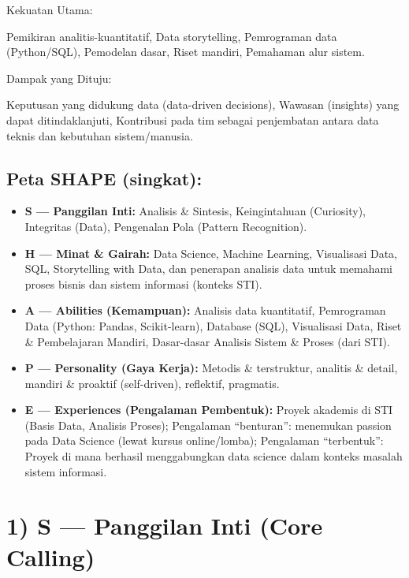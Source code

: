 \documentclass[
  letterpaper,
  DIV=11,
  numbers=noendperiod]{scrreprt}
\providecommand{\tightlist}{%
  \setlength{\itemsep}{0pt}\setlength{\parskip}{0pt}}
\begin{document}
Kekuatan Utama:

Pemikiran analitis-kuantitatif, Data storytelling, Pemrograman data
(Python/SQL), Pemodelan dasar, Riset mandiri, Pemahaman alur sistem.

Dampak yang Dituju:

Keputusan yang didukung data (data-driven decisions), Wawasan (insights)
yang dapat ditindaklanjuti, Kontribusi pada tim sebagai penjembatan
antara data teknis dan kebutuhan sistem/manusia.

\subsection{Peta SHAPE (singkat):}\label{peta-shape-singkat}

\begin{itemize}
\tightlist
\item
  \textbf{S --- Panggilan Inti:} Analisis \& Sintesis, Keingintahuan
  (Curiosity), Integritas (Data), Pengenalan Pola (Pattern Recognition).
\item
  \textbf{H --- Minat \& Gairah:} Data Science, Machine Learning,
  Visualisasi Data, SQL, Storytelling with Data, dan penerapan analisis
  data untuk memahami proses bisnis dan sistem informasi (konteks STI).
\item
  \textbf{A --- Abilities (Kemampuan):} Analisis data kuantitatif,
  Pemrograman Data (Python: Pandas, Scikit-learn), Database (SQL),
  Visualisasi Data, Riset \& Pembelajaran Mandiri, Dasar-dasar Analisis
  Sistem \& Proses (dari STI).
\item
  \textbf{P --- Personality (Gaya Kerja):} Metodis \& terstruktur,
  analitis \& detail, mandiri \& proaktif (self-driven), reflektif,
  pragmatis.
\item
  \textbf{E --- Experiences (Pengalaman Pembentuk):} Proyek akademis di
  STI (Basis Data, Analisis Proses); Pengalaman ``benturan'': menemukan
  passion pada Data Science (lewat kursus online/lomba); Pengalaman
  ``terbentuk'': Proyek di mana berhasil menggabungkan data science
  dalam konteks masalah sistem informasi.
\end{itemize}

\section{1) S --- Panggilan Inti (Core
Calling)}\label{s-panggilan-inti-core-calling}
\end{document}

